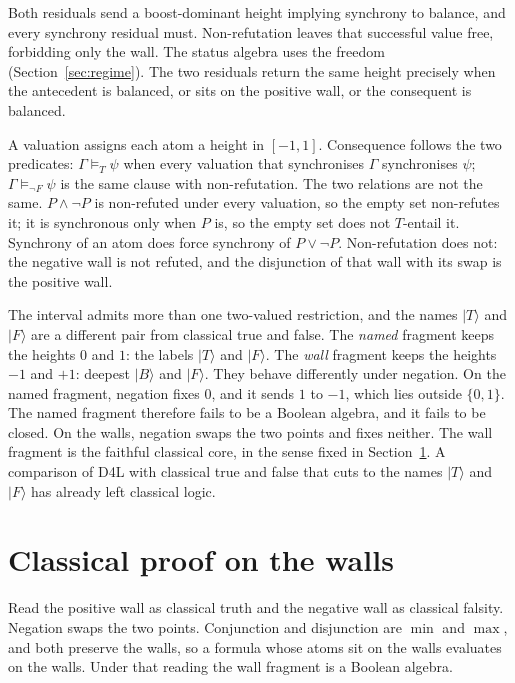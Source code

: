 \documentclass[a4paper]{article}
\theoremstyle{definition}
\begin{document}
Both residuals send a boost-dominant height implying synchrony to
balance, and every synchrony residual must. Non-refutation leaves that
successful value free, forbidding only the wall. The status algebra
uses the freedom (Section~\ref{sec:regime}). The two residuals return
the same height precisely when the antecedent is balanced, or sits on
the positive wall, or the consequent is balanced.

A valuation assigns each atom a height in \([-1,1]\). Consequence
follows the two predicates:
\(\Gamma\models_T\psi\) when every valuation that synchronises \(\Gamma\)
synchronises \(\psi\); \(\Gamma\models_{\lnot F}\psi\) is the same
clause with non-refutation. The two relations are not the same.
\(P\wedge\neg P\) is non-refuted under every valuation, so the empty
set non-refutes it; it is synchronous only when \(P\) is, so the empty
set does not \(T\)-entail it. Synchrony of an atom does force
synchrony of \(P\vee\neg P\). Non-refutation does not: the negative
wall is not refuted, and the disjunction of that wall with its swap
is the positive wall.

The interval admits more than one two-valued restriction, and the
names \(\lvert T\rangle\) and \(\lvert F\rangle\) are a different pair
from classical true and false. The \emph{named} fragment keeps the
heights \(0\) and \(1\): the labels \(\lvert T\rangle\) and
\(\lvert F\rangle\). The \emph{wall} fragment keeps the heights \(-1\)
and \(+1\): deepest \(\lvert B\rangle\) and \(\lvert F\rangle\).
They behave differently under negation. On the named fragment,
negation fixes \(0\), and it sends \(1\) to \(-1\), which lies outside
\(\{0,1\}\). The named fragment therefore fails to be a Boolean
algebra, and it fails to be closed. On the walls, negation swaps the
two points and fixes neither. The wall fragment is the faithful
classical core, in the sense fixed in Section~\ref{sec:wall}. A
comparison of D4L with classical true and false that cuts to the names
\(\lvert T\rangle\) and \(\lvert F\rangle\) has already left classical
logic.

\section{Classical proof on the walls}
\label{sec:wall}

Read the positive wall as classical truth and the negative wall as
classical falsity. Negation swaps the two points. Conjunction and
disjunction are \(\min\) and \(\max\), and both preserve the walls, so
a formula whose atoms sit on the walls evaluates on the walls. Under
that reading the wall fragment is a Boolean algebra.
\end{document}
